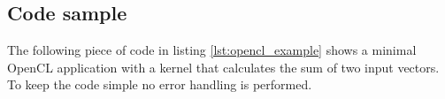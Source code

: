 
\subsection{Code sample}
\label{sec:code_sample}

The following piece of code in listing \ref{lst:opencl_example} shows a minimal OpenCL application with a kernel that calculates the sum of two input vectors. To keep the code simple no error handling is performed.


